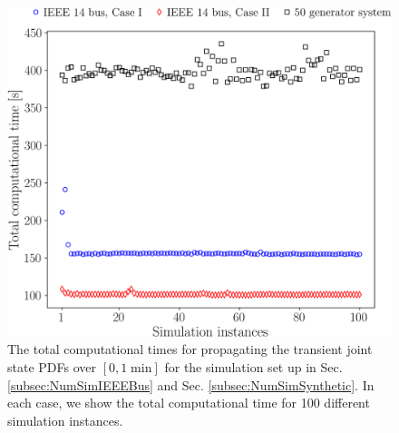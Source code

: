 \documentclass[10pt,twocolumn]{IEEEtran}
\begin{document}
\begin{figure}[htpb]
\centering
\includegraphics[width=0.95\linewidth]{TotalCompTimeForSimulating1MinHist.png}
\caption{\small{The total computational times for propagating the transient joint state PDFs over $[0, 1\;\text{min}]$ for the simulation set up in Sec. \ref{subsec:NumSimIEEEBus} and Sec. \ref{subsec:NumSimSynthetic}. In each case, we show the total computational time for 100 different simulation instances.}}
\vspace*{-0.1in}
\label{fig:TotalCompTime}
\end{figure}
\end{document}

